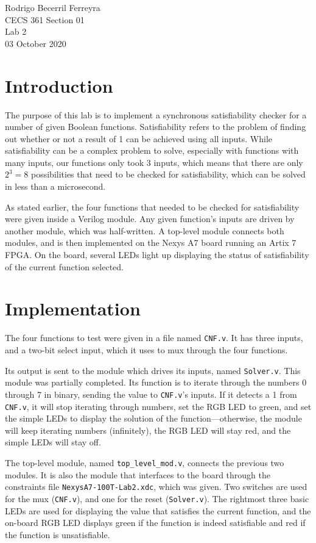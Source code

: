 \documentclass{article}
\renewcommand{\c}[1]{\texttt{#1}}
\begin{document}
    \noindent
    Rodrigo Becerril Ferreyra\\
    CECS 361 Section 01\\
    Lab 2\\
    03 October 2020

\section{Introduction} The purpose of this lab is to implement
a synchronous satisfiability checker for a number of given
Boolean functions. Satisfiability refers to
the problem of finding out
whether or not
a result of 1 can be achieved using all inputs. While
satisfiability can be a complex problem to solve, especially
with functions with many inputs, our functions only took
\(3\) inputs, which means that there are only \(2^3 = 8\)
possibilities that need to be checked for satisfiability,
which can be solved in less than a microsecond.

As stated earlier, the four functions that needed to be checked
for satisfiability were given inside a Verilog module.
Any given function's inputs are driven by another module,
which was half-written. A top-level module connects both
modules, and is then implemented on the Nexys A7 board
running an Artix 7 FPGA. On the board, several LEDs
light up displaying the status of satisfiability of the
current function selected.

\section{Implementation} The four functions to test
were given in a file named \c{CNF.v}. It has three
inputs, and a two-bit select input, which it uses to
mux through the four functions.

Its output is sent to
the module which drives its inputs, named \c{Solver.v}.
This module was partially completed. Its function is to
iterate through the numbers 0 through 7 in binary, sending
the value to \c{CNF.v}'s inputs. If it detects a 1 from
\c{CNF.v}, it will stop iterating through numbers,
set the RGB LED to green, and set the simple LEDs to
display the solution of the function---otherwise,
the module will keep iterating numbers (infinitely),
the RGB LED will stay red, and the simple LEDs will stay
off.

The top-level module, named \c{top\_level\_mod.v}, connects
the previous two modules. It is also the module that interfaces
to the board through the constraints file \c{NexysA7-100T-Lab2.xdc},
which was given. Two switches are used for the mux (\c{CNF.v}),
and one for the reset (\c{Solver.v}). The rightmost three
basic LEDs are used for displaying the value that satisfies
the current function, and the on-board RGB LED displays green
if the function is indeed satisfiable and red if the
function is unsatisfiable.
\end{document}
